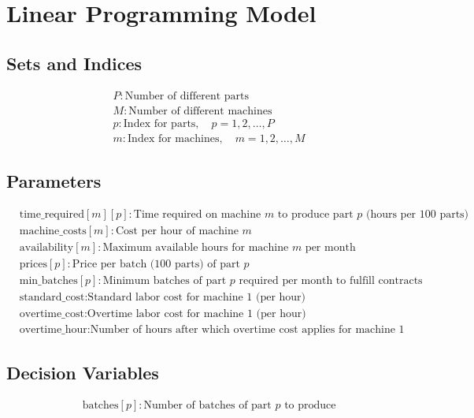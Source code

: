 \documentclass{article}
\begin{document}
\section*{Linear Programming Model}

\subsection*{Sets and Indices}
\begin{align*}
    &P: \text{Number of different parts} \\
    &M: \text{Number of different machines} \\
    &p: \text{Index for parts}, \quad p = 1, 2, \ldots, P \\
    &m: \text{Index for machines}, \quad m = 1, 2, \ldots, M
\end{align*}

\subsection*{Parameters}
\begin{align*}
    &\text{time\_required}[m][p]: \text{Time required on machine } m \text{ to produce part } p \text{ (hours per 100 parts)} \\
    &\text{machine\_costs}[m]: \text{Cost per hour of machine } m \\
    &\text{availability}[m]: \text{Maximum available hours for machine } m \text{ per month} \\
    &\text{prices}[p]: \text{Price per batch (100 parts) of part } p \\
    &\text{min\_batches}[p]: \text{Minimum batches of part } p \text{ required per month to fulfill contracts} \\
    &\text{standard\_cost}: \text{Standard labor cost for machine 1 (per hour)} \\
    &\text{overtime\_cost}: \text{Overtime labor cost for machine 1 (per hour)} \\
    &\text{overtime\_hour}: \text{Number of hours after which overtime cost applies for machine 1}
\end{align*}

\subsection*{Decision Variables}
\begin{align*}
    &\text{batches}[p]: \text{Number of batches of part } p \text{ to produce}
\end{align*}
\end{document}
